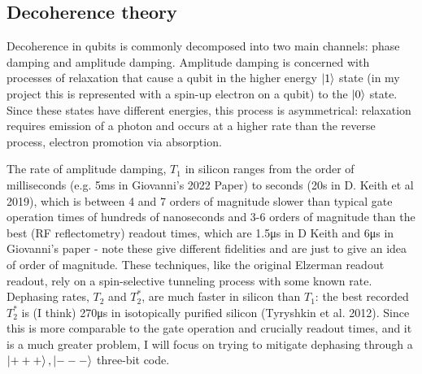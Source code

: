 \documentclass{report}
\begin{document}
\begin{appendices}
\chapter{Decoherence theory}
Decoherence in qubits is commonly decomposed into two main channels: phase damping and amplitude damping. Amplitude damping is concerned with processes of relaxation that cause a qubit in the higher energy $\ket{1}$ state (in my project this is represented with a spin-up electron on a qubit) to the $\ket{0}$ state. Since these states have different energies, this process is asymmetrical: relaxation requires emission of a photon and occurs at a higher rate than the reverse process, electron promotion via absorption. 

The rate of amplitude damping, $T_1$ in silicon ranges from the order of milliseconds (e.g. 5\si{ms} in Giovanni's 2022 Paper) to seconds (20s in D. Keith et al 2019), which is between 4 and 7 orders of magnitude slower than typical gate operation times of hundreds of nanoseconds and 3-6 orders of magnitude than the best (RF reflectometry) readout times, which are 1.5\si{\micro s} in D Keith and 6\si{\micro s} in Giovanni's paper - note these give different fidelities and are just to give an idea of order of magnitude. These techniques, like the original Elzerman readout readout, rely on a spin-selective tunneling process with some known rate. Dephasing rates, $T_2$ and $T_2^{*}$, are much faster in silicon than $T_1$: the best recorded $T_2^*$ is (I think) 270\si{\micro s} in isotopically purified silicon (Tyryshkin et al. 2012). Since this is more comparable to the gate operation and crucially readout times, and it is a much greater problem, I will focus on trying to mitigate dephasing through a $\ket{+++}, \ket{---}$ three-bit code.



\end{appendices}
\end{document}
